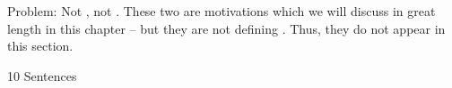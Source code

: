 Problem: Not \MMORGS, not \NVES. These two are motivations which we
will discuss in great length in this chapter -- but they are not
defining \SYNEIGHT. Thus, they do not appear in this section.

10 Sentences

